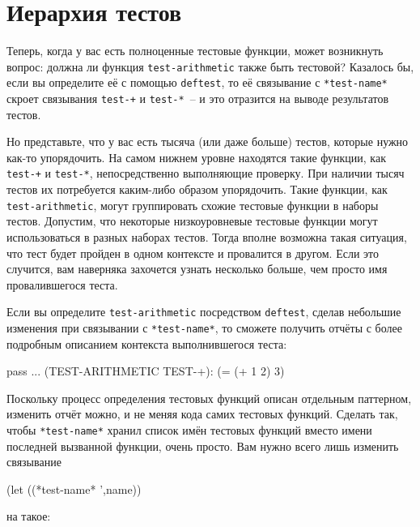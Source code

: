 \section{Иерархия тестов}

Теперь, когда у вас есть полноценные тестовые функции, может возникнуть вопрос: должна
ли функция \lstinline{test-arithmetic} также быть тестовой? Казалось бы, если вы определите
её с помощью \lstinline{deftest}, то её связывание с \lstinline{*test-name*} скроет связывания
\lstinline{test-+} и \lstinline{test-*}~-- и это отразится на выводе результатов тестов.

Но представьте, что у вас есть тысяча (или даже больше) тестов, которые нужно как-то
упорядочить. На самом нижнем уровне находятся такие функции, как \lstinline{test-+} и
\lstinline{test-*}, непосредственно выполняющие проверку. При наличии тысяч тестов их
потребуется каким-либо образом упорядочить. Такие функции, как \lstinline{test-arithmetic}, могут
группировать схожие тестовые функции в наборы тестов. Допустим, что некоторые
низкоуровневые тестовые функции могут использоваться в разных наборах тестов. Тогда вполне
возможна такая ситуация, что тест будет пройден в одном контексте и провалится в
другом. Если это случится, вам наверняка захочется узнать несколько больше, чем просто имя
провалившегося теста.

Если вы определите \lstinline{test-arithmetic} посредством \lstinline{deftest}, сделав небольшие
изменения при связывании с \lstinline{*test-name*}, то сможете получить отчёты с более
подробным описанием контекста выполнившегося теста:

\begin{myverb}
pass ... (TEST-ARITHMETIC TEST-+): (= (+ 1 2) 3)
\end{myverb}

Поскольку процесс определения тестовых функций описан отдельным паттерном, изменить отчёт
можно, и не меняя кода самих тестовых функций. Сделать так, чтобы \lstinline{*test-name*} хранил список имён
тестовых функций вместо имени последней вызванной функции, очень просто. Вам нужно всего
лишь изменить связывание

\begin{myverb}
(let ((*test-name* ',name))
\end{myverb}

\noindent{}на такое:


